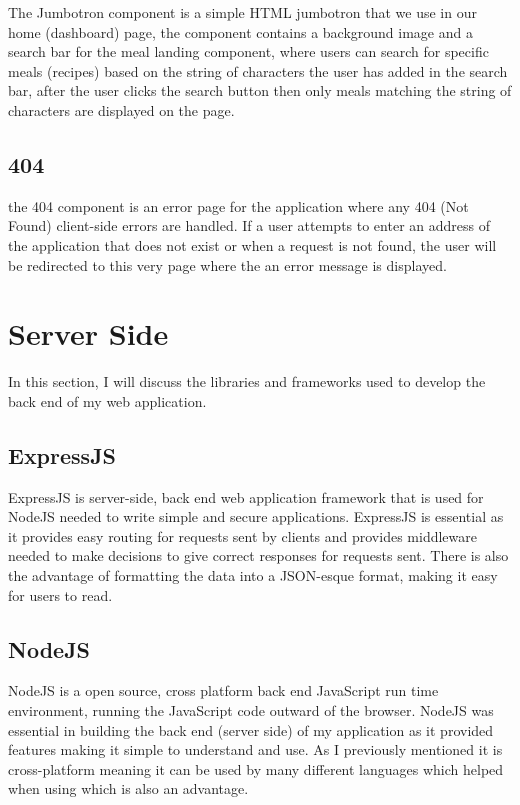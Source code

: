 The Jumbotron component is a simple HTML jumbotron that we use in our home (dashboard) page, the component contains a background image and a search bar for the meal landing component, where users can search for specific meals (recipes) based on the string of characters the user has added in the search bar, after the user clicks the search button then only meals matching the string of characters are displayed on the page.

\subsection{404}

the 404 component is an error page for the application where any 404 (Not Found) client-side errors are handled. If a user attempts to enter an address of the application that does not exist or when a request is not found, the user will be redirected to this very page where the an error message is displayed. 

\section{Server Side}

In this section, I will discuss the libraries and frameworks used to develop the back end of my web application.

\subsection{ExpressJS}

ExpressJS is server-side, back end web application framework that is used for NodeJS needed to write simple and secure applications. ExpressJS is essential as it provides easy routing for requests sent by clients and provides middleware needed to make decisions to give correct responses for requests sent. There is also the advantage of formatting the data into a JSON-esque format, making it easy for users to read.

\subsection{NodeJS}

NodeJS is a open source, cross platform back end JavaScript run time environment, running the JavaScript code outward of the browser. NodeJS was essential in building the back end (server side) of my application as it provided features making it simple to understand and use. As I previously mentioned it is cross-platform meaning it can be used by many different languages which helped when using which is also an advantage.


